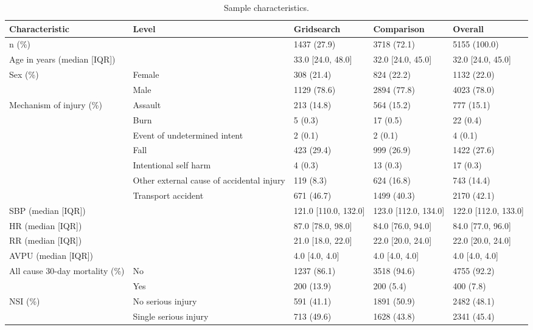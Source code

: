 \begin{table}[!ht]
\centering
\caption{Sample characteristics.} 
\label{tab:sample-characteristics}
\begin{adjustbox}{max width = \linewidth} 
\begin{threeparttable} 
\begin{tabular} 
{lllll}
  \toprule
Characteristic & Level & Gridsearch & Comparison & Overall \\ 
  \midrule
n (\%) &  & 1437 (27.9) & 3718 (72.1) & 5155 (100.0) \\ 
  Age in years (median [IQR]) &  & 33.0 [24.0, 48.0] & 32.0 [24.0, 45.0] & 32.0 [24.0, 45.0] \\ 
  Sex (\%) & Female & 308 (21.4) & 824 (22.2) & 1132 (22.0) \\ 
   & Male & 1129 (78.6) & 2894 (77.8) & 4023 (78.0) \\ 
  Mechanism of injury (\%) & Assault & 213 (14.8) & 564 (15.2) & 777 (15.1) \\ 
   & Burn & 5 (0.3) & 17 (0.5) & 22 (0.4) \\ 
   & Event of undetermined intent & 2 (0.1) & 2 (0.1) & 4 (0.1) \\ 
   & Fall & 423 (29.4) & 999 (26.9) & 1422 (27.6) \\ 
   & Intentional self harm & 4 (0.3) & 13 (0.3) & 17 (0.3) \\ 
   & Other external cause of accidental injury & 119 (8.3) & 624 (16.8) & 743 (14.4) \\ 
   & Transport accident & 671 (46.7) & 1499 (40.3) & 2170 (42.1) \\ 
  SBP (median [IQR]) &  & 121.0 [110.0, 132.0] & 123.0 [112.0, 134.0] & 122.0 [112.0, 133.0] \\ 
  HR (median [IQR]) &  & 87.0 [78.0, 98.0] & 84.0 [76.0, 94.0] & 84.0 [77.0, 96.0] \\ 
  RR (median [IQR]) &  & 21.0 [18.0, 22.0] & 22.0 [20.0, 24.0] & 22.0 [20.0, 24.0] \\ 
  AVPU (median [IQR]) &  & 4.0 [4.0, 4.0] & 4.0 [4.0, 4.0] & 4.0 [4.0, 4.0] \\ 
  All cause 30-day mortality (\%) & No & 1237 (86.1) & 3518 (94.6) & 4755 (92.2) \\ 
   & Yes & 200 (13.9) & 200 (5.4) & 400 (7.8) \\ 
  NSI (\%) & No serious injury & 591 (41.1) & 1891 (50.9) & 2482 (48.1) \\ 
   & Single serious injury & 713 (49.6) & 1628 (43.8) & 2341 (45.4) \\ 

\end{tabular}
\end{threeparttable}
\end{adjustbox}
\end{table}
